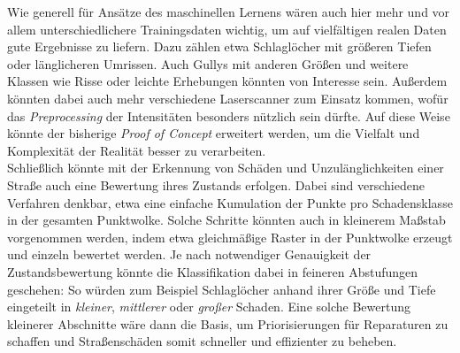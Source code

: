 Wie generell für Ansätze des maschinellen Lernens wären auch hier mehr und vor allem unterschiedlichere Trainingsdaten wichtig, um auf vielfältigen realen Daten gute Ergebnisse zu liefern. Dazu zählen etwa Schlaglöcher mit größeren Tiefen oder länglicheren Umrissen. Auch Gullys mit anderen Größen und weitere Klassen wie Risse oder leichte Erhebungen könnten von Interesse sein. Außerdem könnten dabei auch mehr verschiedene Laserscanner zum Einsatz kommen, wofür das \textit{Preprocessing} der Intensitäten besonders nützlich sein dürfte. Auf diese Weise könnte der bisherige \textit{Proof of Concept} erweitert werden, um die Vielfalt und Komplexität der Realität besser zu verarbeiten. \\
Schließlich könnte mit der Erkennung von Schäden und Unzulänglichkeiten einer Straße auch eine Bewertung ihres Zustands erfolgen. Dabei sind verschiedene Verfahren denkbar, etwa eine einfache Kumulation der Punkte pro Schadensklasse in der gesamten Punktwolke. Solche Schritte könnten auch in kleinerem Maßstab vorgenommen werden, indem etwa gleichmäßige Raster in der Punktwolke erzeugt und einzeln bewertet werden. Je nach notwendiger Genauigkeit der Zustandsbewertung könnte die Klassifikation dabei in feineren Abstufungen geschehen: So würden zum Beispiel Schlaglöcher anhand ihrer Größe und Tiefe eingeteilt in \textit{kleiner}, \textit{mittlerer} oder \textit{großer} Schaden. Eine solche Bewertung kleinerer Abschnitte wäre dann die Basis, um Priorisierungen für Reparaturen zu schaffen und Straßenschäden somit schneller und effizienter zu beheben.